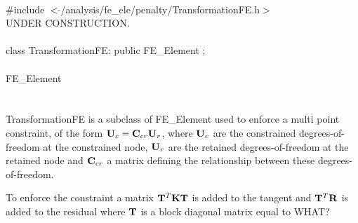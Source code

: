 
   \\
\indent \#include $<\tilde{ }$/analysis/fe\_ele/penalty/TransformationFE.h$>$  \\

UNDER CONSTRUCTION. \\

  \\
\indent class TransformationFE: public FE\_Element ;  \\

  \\
\indent FE\_Element \\
\indent{} \\ 

  \\
\indent TransformationFE is a subclass of FE\_Element used to enforce a
multi point constraint, of the form ${\bf U}_c = {\bf C}_{cr} {\bf U}_r$, where ${\bf U}_c$ are
the constrained degrees-of-freedom at the constrained node, ${\bf U}_r$ are
the retained degrees-of-freedom at the retained node and ${\bf C}_{cr}$ a
matrix defining the relationship between these degrees-of-freedom. 

To enforce the constraint a matrix ${\bf T}^T {\bf K} {\bf T}$ is added to the
tangent and ${\bf T}^T {\bf R}$ is added to the residual where ${\bf T}$ is a block
diagonal matrix equal to WHAT?


